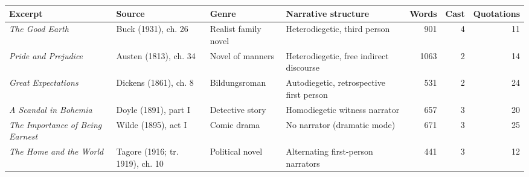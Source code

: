 \begin{tabular}{p{3.0cm}p{2.6cm}p{2.2cm}p{3.0cm}rrr}
\toprule
Excerpt & Source & Genre & Narrative structure & Words & Cast & Quotations \\
\midrule
\textit{The Good Earth} & Buck (1931), ch. 26 & Realist family novel & Heterodiegetic, third person & 901 & 4 & 11 \\
\textit{Pride and Prejudice} & Austen (1813), ch. 34 & Novel of manners & Heterodiegetic, free indirect discourse & 1063 & 2 & 14 \\
\textit{Great Expectations} & Dickens (1861), ch. 8 & Bildungsroman & Autodiegetic, retrospective first person & 531 & 2 & 24 \\
\textit{A Scandal in Bohemia} & Doyle (1891), part I & Detective story & Homodiegetic witness narrator & 657 & 3 & 20 \\
\textit{The Importance of Being Earnest} & Wilde (1895), act I & Comic drama & No narrator (dramatic mode) & 671 & 3 & 25 \\
\textit{The Home and the World} & Tagore (1916; tr. 1919), ch. 10 & Political novel & Alternating first-person narrators & 441 & 3 & 12 \\
\bottomrule
\end{tabular}
